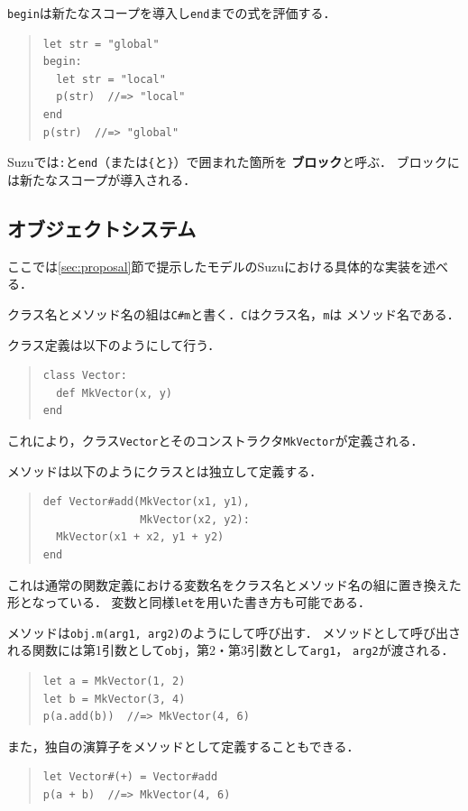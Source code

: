\documentclass{ipsjprosym}
\begin{document}
\verb|begin|は新たなスコープを導入し\verb|end|までの式を評価する．
\begin{quote}
\begin{verbatim}
let str = "global"
begin:
  let str = "local"
  p(str)  //=> "local"
end
p(str)  //=> "global"
\end{verbatim}
\end{quote}
Suzuでは\verb|:|と\verb|end|（または\verb|{|と\verb|}|）で囲まれた箇所を
\textbf{ブロック}と呼ぶ．
ブロックには新たなスコープが導入される．

\subsection{オブジェクトシステム}

ここでは\ref{sec:proposal}節で提示したモデルのSuzuにおける具体的な実装を述べる．

クラス名とメソッド名の組は\verb|C#m|と書く．\verb|C|はクラス名，\verb|m|は
メソッド名である．

クラス定義は以下のようにして行う．
\begin{quote}
\begin{verbatim}
class Vector:
  def MkVector(x, y)
end
\end{verbatim}
\end{quote}
これにより，クラス\verb|Vector|とそのコンストラクタ\verb|MkVector|が定義される．

メソッドは以下のようにクラスとは独立して定義する．
\begin{quote}
\begin{verbatim}
def Vector#add(MkVector(x1, y1),
               MkVector(x2, y2):
  MkVector(x1 + x2, y1 + y2)
end
\end{verbatim}
\end{quote}
これは通常の関数定義における変数名をクラス名とメソッド名の組に置き換えた形となっている．
変数と同様\verb|let|を用いた書き方も可能である．

メソッドは\verb|obj.m(arg1, arg2)|のようにして呼び出す．
メソッドとして呼び出される関数には第1引数として\verb|obj|，第2・第3引数として\verb|arg1|，
\verb|arg2|が渡される．
\begin{quote}
\begin{verbatim}
let a = MkVector(1, 2)
let b = MkVector(3, 4)
p(a.add(b))  //=> MkVector(4, 6)
\end{verbatim}
\end{quote}
また，独自の演算子をメソッドとして定義することもできる．
\begin{quote}
\begin{verbatim}
let Vector#(+) = Vector#add
p(a + b)  //=> MkVector(4, 6)
\end{verbatim}
\end{quote}
\end{document}
